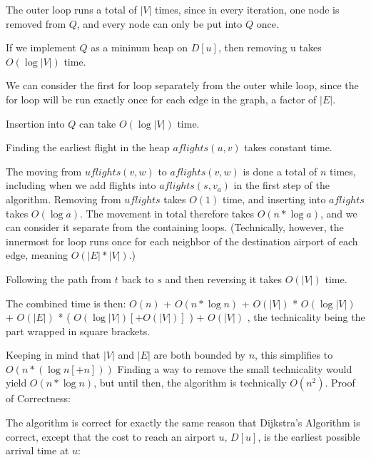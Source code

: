 \documentclass[11pt]{article}
\begin{document}
The outer loop runs a total of $|V|$ times, since in every iteration, one node is removed from $Q$, and every node can only be put into $Q$ once.

If we implement $Q$ as a mininum heap on $D[u]$, then removing u takes $O(\log{|V|})$ time.

We can consider the first for loop separately from the outer while loop, since the for loop will be run exactly once for each edge in the graph, a factor of $|E|$.

Insertion into $Q$ can take $O(\log{|V|})$ time.

Finding the earliest flight in the heap $aflights(u, v)$ takes constant time.

The moving from $uflights(v, w)$ to $aflights(v, w)$ is done a total of $n$ times, including when we add flights into $aflights(s, v_{a})$ in the first step of the algorithm. Removing from $uflights$ takes $O(1)$ time, and inserting into $aflights$ takes $O(\log{a})$. The movement in total therefore takes $O(n*\log{a})$, and we can consider it separate from the containing loops.
(Technically, however, the innermost for loop runs once for each neighbor of the destination airport of each edge, meaning $O(|E|*|V|)$.)

Following the path from $t$ back to $s$ and then reversing it takes $O(|V|)$ time.

The combined time is then:
$O(n)$ + $O(n*\log{n})$ + $O(|V|)$ * $O(\log{|V|})$ + $O(|E|)$ * ( $O(\log{|V|}) [ + O(|V|)]$ ) + $O(|V|)$ , the technicality being the part wrapped in square brackets.

Keeping in mind that $|V|$ and $|E|$ are both bounded by $n$, this simplifies to
$O(n * (\log{n} [+ n]))$
Finding a way to remove the small technicality would yield $O(n*\log{n})$, but until then, the algorithm is technically $O(n^{2})$. \newline \newline
Proof of Correctness: \newline

The algorithm is correct for exactly the same reason that Dijkstra's Algorithm is correct, except that the cost to reach an airport $u$, $D[u]$, is the earliest possible arrival time at $u$:
\end{document}
